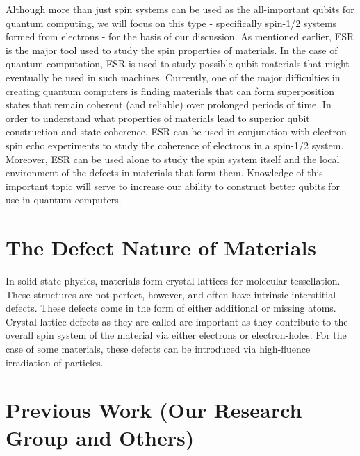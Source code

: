 \documentclass[oneside, astronomy, noacknowlegments]{BYUPhys}
\begin{document}
Although more than just spin systems can be used as the all-important qubits for quantum computing, we will focus on this type - specifically spin-1/2 systems formed from electrons - for the basis of our discussion. As mentioned earlier, ESR is the major tool used to study the spin properties of materials. In the case of quantum computation, ESR is used to study possible qubit materials that might eventually be used in such machines. Currently, one of the major difficulties in creating quantum computers is finding materials that can form superposition states that remain coherent (and reliable) over prolonged periods of time. In order to understand what properties of materials lead to superior qubit construction and state coherence, ESR can be used in conjunction with electron spin echo experiments to study the coherence of electrons in a spin-1/2 system. Moreover, ESR can be used alone to study the spin system itself and the local environment of the defects in materials that form them. Knowledge of this important topic will serve to increase our ability to construct better qubits for use in quantum computers.

\section{The Defect Nature of Materials}

In solid-state physics, materials form crystal lattices for molecular tessellation. These structures are not perfect, however, and often have intrinsic interstitial defects. These defects come in the form of either additional or missing atoms. Crystal lattice defects as they are called are important as they contribute to the overall spin system of the material via either electrons or electron-holes. For the case of some materials, these defects can be introduced via high-fluence irradiation of particles.

\section{Previous Work (Our Research Group and Others)}
\end{document}
